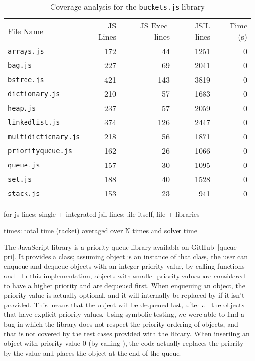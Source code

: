 \begin{table}[h]
{
\small
\begin{tabular}{lrrrr}
\toprule
File Name & JS Lines & JS Exec. lines & JSIL lines & Time (s)\\
\cmidrule{1-5}
\texttt{arrays.js} & 172 & 44 & 1251 & 0 \\
\texttt{bag.js} & 227 & 69 & 2041 & 0\\
\texttt{bstree.js} & 421 & 143 & 3819 & 0\\
\texttt{dictionary.js} & 210 & 57 & 1683 & 0\\
\texttt{heap.js} & 237 & 57 & 2059 & 0\\
\texttt{linkedlist.js} & 374 & 126 & 2447 & 0\\
\texttt{multidictionary.js} & 218 & 56 & 1871 & 0\\
\texttt{priorityqueue.js} & 162 & 26 & 1066 & 0\\
\texttt{queue.js} & 157 & 30 & 1095 & 0\\
\texttt{set.js} & 188 & 40 & 1528 & 0\\
\texttt{stack.js} & 153 & 23 & 941 & 0\\
\bottomrule
\end{tabular}
}
\caption{Coverage analysis for the \texttt{buckets.js} library}
\end{table}
\FloatBarrier

for js lines: single + integrated
jsil lines: file itself, file + libraries

times: total time (racket) averaged over N times and solver time


The JavaScript  library is a priority queue library available on GitHub~\ref{queue-pri}.
It provides a  class; assuming object  is an instance of that class, the user can enqueue and dequeue objects with an integer priority value, by calling functions  and .
In this implementation, objects with smaller priority values are considered to have a higher priority and are dequeued first.
When enqueuing an object, the priority value is actually optional, and it will internally be replaced by  if it isn't provided.
This means that the object will be dequeued last, after all the objects that have explicit priority values.
Using \cosette symbolic testing, we were able to find a bug in which the library does not respect the priority ordering of objects, and that is not covered by the test cases provided with the library.
When inserting an object with priority value $0$ (by calling ), the code actually replaces the priority by the  value and places the object at the end of the queue.


